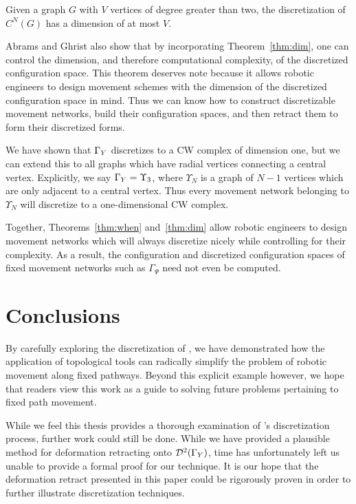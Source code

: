 \begin{thm} \label{thm:dim}
Given a graph $G$ with $V$ vertices of degree greater than two, the discretization of $C^N(G)$ has a dimension of at most $V$.~\cite{factory}
\end{thm}

Abrams and Ghrist also show that by incorporating Theorem~\ref{thm:dim}, one can control the dimension, and therefore computational complexity, of the discretized configuration space\cite{factory}. This theorem deserves note because it allows robotic engineers to design movement schemes with the dimension of the discretized configuration space in mind. Thus we can know how to construct discretizable movement networks, build their configuration spaces, and then retract them to form their discretized forms.

We have shown that $\Gamma_Y$ discretizes to a CW complex of dimension one, but we can extend this to all graphs which have radial vertices connecting a central vertex. Explicitly, we say $\Gamma_Y = \Upsilon_3$, where $\Upsilon_N$ is a graph of $N-1$ vertices which are only adjacent to a central vertex. Thus every movement network belonging to $\Upsilon_N$ will discretize to a one-dimensional CW complex.

Together, Theorems~\ref{thm:when} and~\ref{thm:dim} allow robotic engineers to design movement networks which will always discretize nicely while controlling for their complexity. As a result, the configuration and discretized configuration spaces of fixed movement networks such as $\Gamma_{\Psi}$ need not even be computed. 

\section{Conclusions}
By carefully exploring the discretization of \C, we have demonstrated how the application of topological tools can radically simplify the problem of robotic movement along fixed pathways. Beyond this explicit example however, we hope that readers view this work as a guide to solving future problems pertaining to fixed path movement. 

While we feel this thesis provides a thorough examination of \C 's discretization process, further work could still be done. While we have provided a plausible method for deformation retracting \C onto $\mathcal{D}^2(\Gamma_Y)$, time has unfortunately left us unable to provide a formal proof for our technique. It is our hope that the deformation retract presented in this paper could be rigorously proven in order to further illustrate discretization techniques. 

